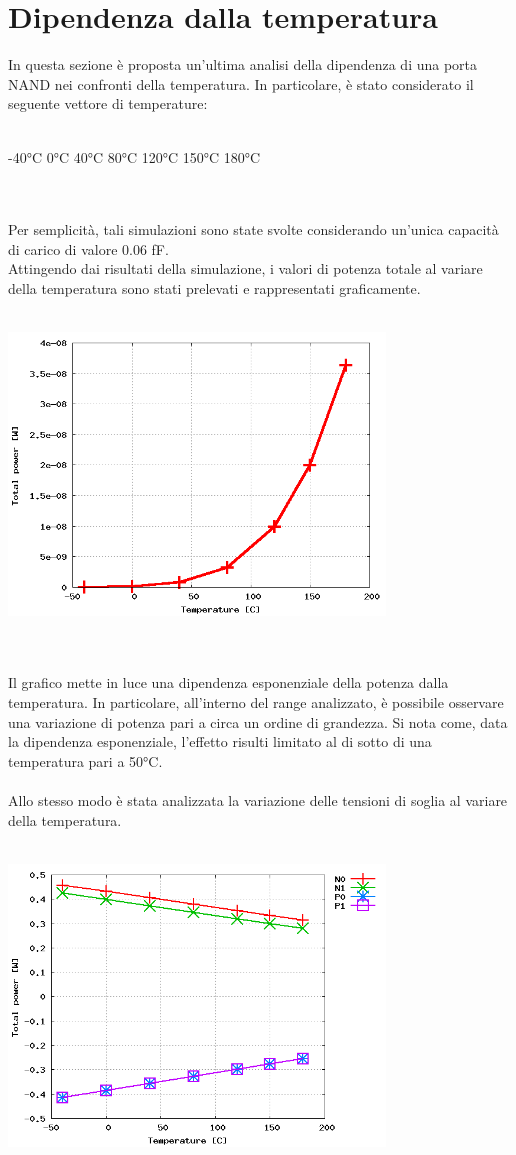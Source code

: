 \documentclass[11pt,  english, makeidx, a4paper, titlepage, oneside]{book}
\begin{document}
\section{Dipendenza dalla temperatura}
In questa sezione è proposta un'ultima analisi della dipendenza di una porta NAND nei confronti della temperatura. In particolare, è stato considerato il seguente vettore di temperature:
\\\\
\centerline{-40°C  0°C   40°C   80°C   120°C   150°C   180°C}
\\\\
Per semplicità, tali simulazioni sono state svolte considerando un'unica capacità di carico di valore 0.06 fF.
\\
Attingendo dai risultati della simulazione, i valori di potenza totale al variare della temperatura sono stati prelevati e rappresentati graficamente.
\\\\
\centerline{\includegraphics[width=10cm]{./img/Lab_5/power_temp.png}}
\\\\
Il grafico mette in luce una dipendenza esponenziale della potenza dalla temperatura. In particolare, all'interno del range analizzato, è possibile osservare una variazione di potenza pari a circa un ordine di grandezza. Si nota come, data la dipendenza esponenziale, l'effetto risulti limitato al di sotto di una temperatura pari a 50°C.
\\\\
Allo stesso modo è stata analizzata la variazione delle tensioni di soglia al variare della temperatura. 
\\\\
\centerline{\includegraphics[width=10cm]{./img/Lab_5/vt_temp.png}}
\end{document}
